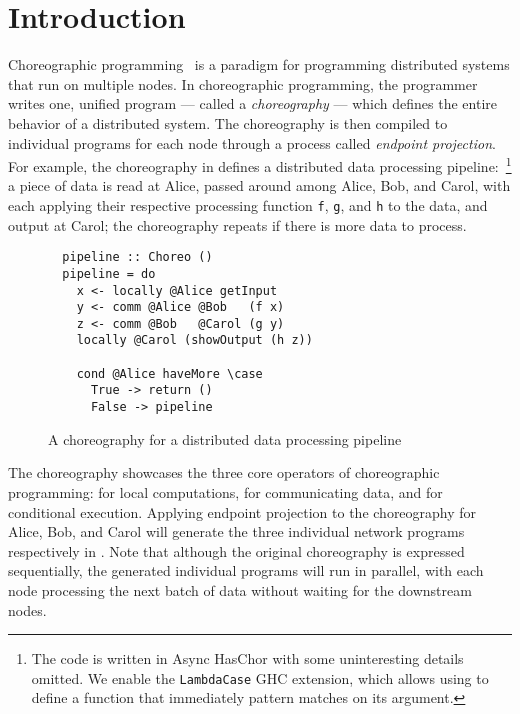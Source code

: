 \section{Introduction}

Choreographic programming~\citep{montesi-thesis, montesi-textbook} is a paradigm for programming distributed systems that run on multiple nodes.
%
In choreographic programming, the programmer writes one, unified program --- called a \emph{choreography} --- which defines the entire behavior of a distributed system.
%
The choreography is then compiled to individual programs for each node through a process called \emph{endpoint projection}.
%
For example, the choreography in  defines a distributed data processing pipeline:~\footnote{The code is written in Async HasChor with some uninteresting details omitted. We enable the \texttt{LambdaCase} GHC extension, which allows using \hs{\case} to define a function that immediately pattern matches on its argument.}  
%
a piece of data is read at Alice, passed around among Alice, Bob, and Carol, with each applying their respective processing function \texttt{f}, \texttt{g}, and \texttt{h} to the data, and output at Carol;
%
the choreography repeats if there is more data to process.

\begin{figure}[h]
\centering
\begin{minipage}{0.5\textwidth}
\begin{verbatim}
  pipeline :: Choreo ()
  pipeline = do
    x <- locally @Alice getInput
    y <- comm @Alice @Bob   (f x)
    z <- comm @Bob   @Carol (g y)
    locally @Carol (showOutput (h z))

    cond @Alice haveMore \case 
      True -> return ()
      False -> pipeline
\end{verbatim}
\end{minipage}
\caption{A choreography for a distributed data processing pipeline}
\label{fig:pipeline}
\end{figure}

The  choreography showcases the three core operators of choreographic programming:  for local computations,  for communicating data, and  for conditional execution.
%
Applying endpoint projection to the  choreography for Alice, Bob, and Carol will generate the three individual network programs respectively in .
%
Note that although the original choreography is expressed sequentially, the generated individual programs will run in parallel, with each node processing the next batch of data without waiting for the downstream nodes.

